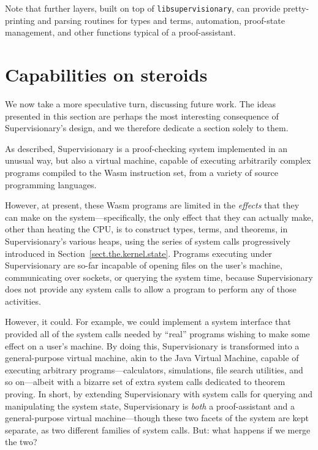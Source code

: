 \documentclass[a4paper, UKenglish, cleveref, autoref, thm-restate, colorlinks]{lipics-v2021}
\begin{document}
Note that further layers, built on top of \texttt{libsupervisionary}, can provide pretty-printing and parsing routines for types and terms, automation, proof-state management, and other functions typical of a proof-assistant.

\section{Capabilities on steroids}
\label{sect.capabilities.on.steroids}

We now take a more speculative turn, discussing future work.
The ideas presented in this section are perhaps the most interesting consequence of Supervisionary's design, and we therefore dedicate a section solely to them.

As described, Supervisionary is a proof-checking system implemented in an unusual way, but also a virtual machine, capable of executing arbitrarily complex programs compiled to the Wasm instruction set, from a variety of source programming languages.

However, at present, these Wasm programs are limited in the \emph{effects} that they can make on the system---specifically, the only effect that they can actually make, other than heating the CPU, is to construct types, terms, and theorems, in Supervisionary's various heaps, using the series of system calls progressively introduced in Section~\ref{sect.the.kernel.state}.
Programs executing under Supervisionary are so-far incapable of opening files on the user's machine, communicating over sockets, or querying the system time, because Supervisionary does not provide any system calls to allow a program to perform any of those activities.

However, it could.
For example, we could implement a system interface that provided all of the system calls needed by ``real'' programs wishing to make some effect on a user's machine.
By doing this, Supervisionary is transformed into a general-purpose virtual machine, akin to the Java Virtual Machine, capable of executing arbitrary programs---calculators, simulations, file search utilities, and so on---albeit with a bizarre set of extra system calls dedicated to theorem proving.
In short, by extending Supervisionary with system calls for querying and manipulating the system state, Supervisionary is \emph{both} a proof-assistant and a general-purpose virtual machine---though these two facets of the system are kept separate, as two different families of system calls.
But: what happens if we merge the two?
\end{document}

